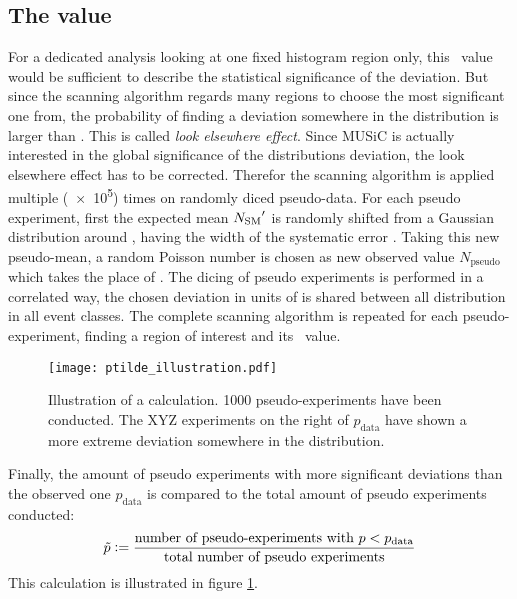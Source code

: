 \subsection{The \ptilde value}
\label{sec:music_ptilde}
For a dedicated analysis looking at one fixed histogram region only, this \p~value would be sufficient to describe the statistical significance of the deviation. But since the scanning algorithm regards many regions to choose the most significant one from, the probability of finding a deviation somewhere in the distribution is larger than \p. This is called \emph{look elsewhere effect}.
Since MUSiC is actually interested in the global significance of the distributions deviation, the look elsewhere effect has to be corrected.
Therefor the scanning algorithm is applied multiple (\num{e5}) times on randomly diced pseudo-data. For each pseudo experiment, first the expected mean ${N_\mathrm{SM}}'$ is randomly shifted from a Gaussian distribution around \Nmc, having the width of the systematic error \sigmamc. Taking this new pseudo-mean, a random Poisson number is chosen as new observed value $N_\mathrm{pseudo}$ which takes the place of \Ndata. The dicing of pseudo experiments is performed in a correlated way, the chosen deviation in units of \sigmamc is shared between all distribution in all event classes. The complete scanning algorithm is repeated for each pseudo-experiment, finding a region of interest and its \p~value.
\begin{figure}[htb]
	\centering
	\texttt{[image: ptilde\_illustration.pdf]}
	\caption{Illustration of a \ptilde calculation. \num{1000} pseudo-experiments have been conducted. The XYZ experiments on the right of $p_\mathrm{data}$ have shown a more extreme deviation somewhere in the distribution.}
	\label{fig:ptilde_illustration}
\end{figure}
Finally, the amount of pseudo experiments with more significant deviations than the observed one $p_\mathrm{data}$ is compared to the total amount of pseudo experiments conducted:
\begin{equation}
	\tilde{p} \vcentcolon= \frac{\text{number of pseudo-experiments with } p < p_\mathrm{data}}{\text{total number of pseudo experiments}}
\end{equation}
This calculation is illustrated in figure \ref{fig:ptilde_illustration}.
